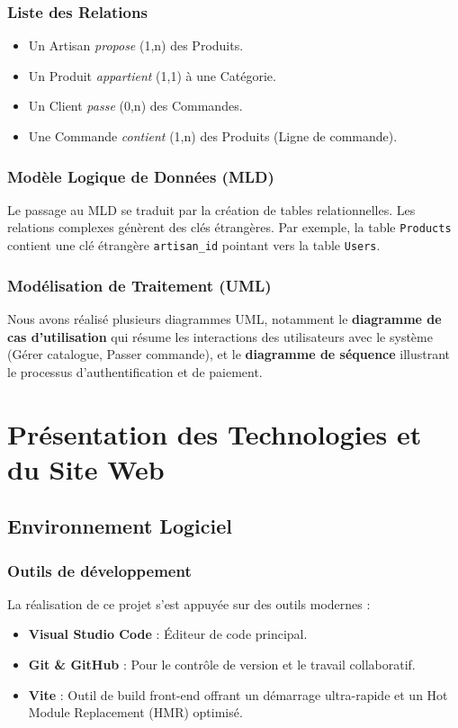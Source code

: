 \documentclass[12pt,a4paper]{report}
\begin{document}
\subsection{Liste des Relations}
\begin{itemize}
    \item Un Artisan \textit{propose} (1,n) des Produits.
    \item Un Produit \textit{appartient} (1,1) à une Catégorie.
    \item Un Client \textit{passe} (0,n) des Commandes.
    \item Une Commande \textit{contient} (1,n) des Produits (Ligne de commande).
\end{itemize}

\subsection{Modèle Logique de Données (MLD)}
Le passage au MLD se traduit par la création de tables relationnelles. Les relations complexes génèrent des clés étrangères. Par exemple, la table \texttt{Products} contient une clé étrangère \texttt{artisan\_id} pointant vers la table \texttt{Users}.

\subsection{Modélisation de Traitement (UML)}
Nous avons réalisé plusieurs diagrammes UML, notamment le \textbf{diagramme de cas d'utilisation} qui résume les interactions des utilisateurs avec le système (Gérer catalogue, Passer commande), et le \textbf{diagramme de séquence} illustrant le processus d'authentification et de paiement.

\chapter{Présentation des Technologies et du Site Web}

\section{Environnement Logiciel}

\subsection{Outils de développement}
La réalisation de ce projet s'est appuyée sur des outils modernes :
\begin{itemize}
    \item \textbf{Visual Studio Code} : Éditeur de code principal.
    \item \textbf{Git \& GitHub} : Pour le contrôle de version et le travail collaboratif.
    \item \textbf{Vite} : Outil de build front-end offrant un démarrage ultra-rapide et un Hot Module Replacement (HMR) optimisé.
\end{itemize}
\end{document}
